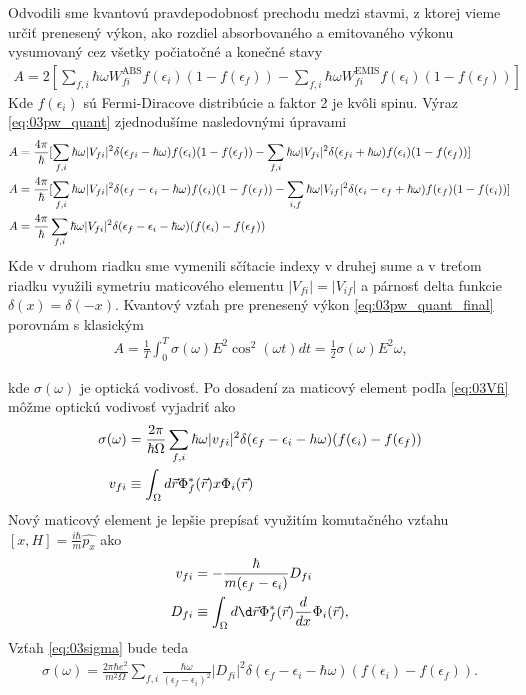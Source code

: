 Odvodili sme kvantovú pravdepodobnosť prechodu medzi stavmi, z ktorej vieme určiť prenesený výkon, ako rozdiel absorbovaného a emitovaného výkonu vysumovaný cez všetky počiatočné a konečné stavy
\begin{align}
\label{eq:03pw_quant}
A=2[\sum_{f,i}\hbar\omega W_{fi}^{\mathrm{ABS}}f(\epsilon_i)(1-f(\epsilon_f))-\sum_{f,i}\hbar\omega W_{fi}^{\mathrm{EMIS}}f(\epsilon_i)(1-f(\epsilon_f))] \
\end{align}
Kde $f(\epsilon_i)$ sú Fermi-Diracove distribúcie a faktor 2 je kvôli spinu. Výraz \eqref{eq:03pw_quant} zjednodušíme nasledovnými úpravami
\begin{align}
\label{eq:03pw_quant_final}
\notag
A&=\frac{4\pi}{\hbar}[\sum_{f,i}\hbar\omega|V_{fi}|^2\delta(\epsilon_{fi}-\hbar\omega)f(\epsilon_i)(1-f(\epsilon_f))-\sum_{f,i}\hbar\omega|V_{fi}|^2\delta(\epsilon_{fi}+\hbar\omega) f(\epsilon_i)(1-f(\epsilon_f))]\\ \notag
A&=\frac{4\pi}{\hbar}[\sum_{f,i}\hbar\omega|V_{fi}|^2\delta(\epsilon_f-\epsilon_i-\hbar\omega)f(\epsilon_i)(1-f(\epsilon_f))-\sum_{i,f}\hbar\omega|V_{if}|^2\delta(\epsilon_i-\epsilon_f+\hbar\omega) f(\epsilon_f)(1-f(\epsilon_i))]\\ 
A&=\frac{4\pi}{\hbar}\sum_{f,i}\hbar\omega|V_{fi}|^2\delta(\epsilon_f-\epsilon_i-\hbar\omega)(f(\epsilon_i)-f(\epsilon_f)) 
\end{align}
Kde v druhom riadku sme vymenili sčítacie indexy v druhej sume a v treťom riadku využili symetriu maticového elementu $|V_{fi}|=|V_{if}|$ a  párnosť delta funkcie $\delta(x)=\delta(-x)$. Kvantový vzťah pre prenesený výkon \eqref{eq:03pw_quant_final} porovnám s klasickým 
\begin{align}
A=\frac{1}{T}\int_0^T\sigma(\omega)E^2\cos^2(\omega t)dt=\frac{1}{2}\sigma(\omega)E^2\omega \text{,}
\end{align}

kde $\sigma(\omega)$ je optická vodivosť. Po dosadení za maticový element podľa \eqref{eq:03Vfi} môžme optickú vodivosť vyjadriť ako
\begin{align}
\label{eq:03sigma}
\sigma(\omega)&=\frac{2\pi}{\hbar \Omega}\sum_{f,i}\hbar\omega|v_{fi}|^2\delta(\epsilon_f-\epsilon_i-h\omega)(f(\epsilon_i)-f(\epsilon_f))\\
v_{fi}&\equiv \int_{\Omega}d\vec{r} \Phi_f^*(\vec{r})x\Phi_i(\vec{r})
\end{align}
Nový maticový element je lepšie prepísať využitím komutačného vzťahu $[x,H]=\frac{i\hbar}{m}\hat{p_x}$ ako
\begin{align}
v_{fi}&=-\frac{\hbar}{m(\epsilon_f-\epsilon_i)}D_{fi}\\
\label{eq:03matrix_element}
D_{fi}&\equiv \int_{\Omega}d\d\vr\Phi_f^*(\vr)\frac{d}{dx}\Phi_i(\vr)\text{,}
\end{align}
Vzťah \eqref{eq:03sigma} bude teda
\begin{align}
\label{eq:03sigma2}
\sigma(\omega)=\frac{2\pi\hbar e^2}{m^2\Omega} \sum_{f,i}\frac{\hbar\omega}{(\epsilon_f-\epsilon_i)^2}|D_{fi}|^2\delta(\epsilon_f-\epsilon_i-\hbar\omega)(f(\epsilon_i)-f(\epsilon_f))\text{.}
\end{align}

